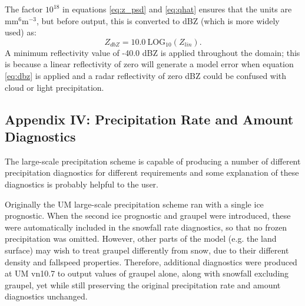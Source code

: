 \documentclass{UMDP_article}
\def\bq{\begin{equation}}
\def\eq{\end{equation}}
\begin{document}
The factor $10^{18}$ in equations \ref{eq:z_psd} and \ref{eq:qhat} ensures that the units are 
mm$^6$m$^{-3}$, but before output, this is converted to dBZ (which is more widely used) as:
\bq
\label{eq:dbz}
Z_{dbZ} = 10.0 ~ \mathrm{LOG}_{10}(Z_{lin}).
\eq
A minimum reflectivity value of -40.0 dBZ is applied throughout the domain; 
this is because a linear reflectivity of zero will generate a model error when 
equation \ref{eq:dbz} is applied and a radar reflectivity of zero dBZ could
be confused with cloud or light precipitation. 

\clearpage
{}
{}
\subsection*{Appendix IV: Precipitation Rate and Amount Diagnostics}

The large-scale precipitation scheme is capable of producing a number of
different precipitation diagnostics for different requirements and some
explanation of these diagnostics is probably helpful to the user.

Originally the UM large-scale precipitation scheme ran with a single ice
prognostic. When the second ice prognostic and graupel were introduced,
these were automatically included in the snowfall rate diagnostics, so that
no frozen precipitation was omitted. However, other parts of the model
(e.g. the land surface) may wish to treat graupel differently from snow, 
due to their different density and fallspeed properties. Therefore, additional 
diagnostics were produced at UM vn10.7 to output values of graupel alone, along 
with snowfall excluding graupel, yet while still preserving the original 
precipitation rate and amount diagnostics unchanged. 
\end{document}
